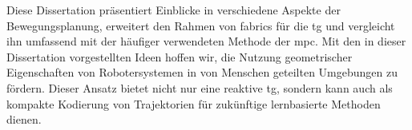Diese Dissertation präsentiert Einblicke in verschiedene Aspekte der
Bewegungsplanung, erweitert den Rahmen von \ac{fabrics} für die \ac{tg} und
vergleicht ihn umfassend mit der häufiger verwendeten Methode der \ac{mpc}. Mit
den in dieser Dissertation vorgestellten Ideen hoffen wir, die Nutzung
geometrischer Eigenschaften von Robotersystemen in von Menschen geteilten
Umgebungen zu fördern. Dieser Ansatz bietet nicht nur eine reaktive \ac{tg},
sondern kann auch als kompakte Kodierung von Trajektorien für zukünftige
lernbasierte Methoden dienen.
